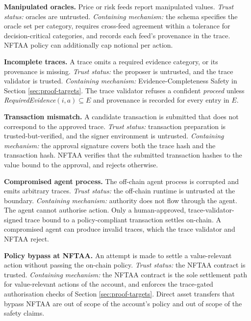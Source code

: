 \begin{description}[leftmargin=1.2cm,labelwidth=0.9cm,style=nextline,itemsep=0.85\baselineskip]
\item[\textbf{T5}] \textbf{Manipulated oracles.} Price or risk feeds report manipulated values.
\textit{Trust status:} oracles are untrusted.
\textit{Containing mechanism:} the schema specifies the oracle set per category, requires cross-feed agreement within a tolerance for decision-critical categories, and records each feed's provenance in the trace. NFTAA policy can additionally cap notional per action.

\item[\textbf{T6}] \textbf{Incomplete traces.} A trace omits a required evidence category, or its provenance is missing.
\textit{Trust status:} the proposer is untrusted, and the trace validator is trusted.
\textit{Containing mechanism:} Evidence-Completeness Safety in Section \ref{sec:proof-targets}. The trace validator refuses a confident \textit{proceed} unless \textit{RequiredEvidence}$(i, a) \subseteq E$ and provenance is recorded for every entry in $E$.

\item[\textbf{T7}] \textbf{Transaction mismatch.} A candidate transaction is submitted that does not correspond to the approved trace.
\textit{Trust status:} transaction preparation is trusted-but-verified, and the signer environment is untrusted.
\textit{Containing mechanism:} the approval signature covers both the trace hash and the transaction hash. NFTAA verifies that the submitted transaction hashes to the value bound to the approval, and rejects otherwise.

\item[\textbf{T8}] \textbf{Compromised agent process.} The off-chain agent process is corrupted and emits arbitrary traces.
\textit{Trust status:} the off-chain runtime is untrusted at the boundary.
\textit{Containing mechanism:} authority does not flow through the agent. The agent cannot authorise action. Only a human-approved, trace-validator-signed trace bound to a policy-compliant transaction settles on-chain. A compromised agent can produce invalid traces, which the trace validator and NFTAA reject.

\item[\textbf{T9}] \textbf{Policy bypass at NFTAA.} An attempt is made to settle a value-relevant action without passing the on-chain policy.
\textit{Trust status:} the NFTAA contract is trusted.
\textit{Containing mechanism:} the NFTAA contract is the sole settlement path for value-relevant actions of the account, and enforces the trace-gated authorisation checks of Section \ref{sec:proof-targets}. Direct asset transfers that bypass NFTAA are out of scope of the account's policy and out of scope of the safety claims.


\end{description}
